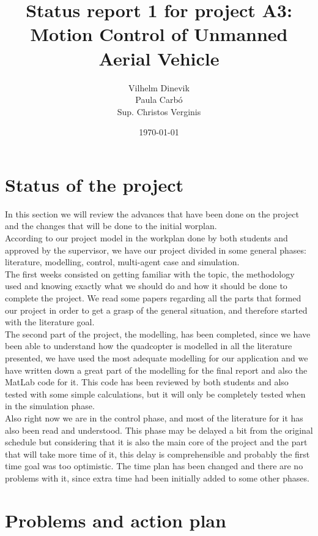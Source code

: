 \documentclass{article}
\title{Status report 1 for project A3: Motion Control of Unmanned Aerial Vehicle}
\author{Vilhelm Dinevik \\ Paula Carbó \\ Sup. Christos Verginis}
\date{\today}
\begin{document}
	\maketitle
	
	\bigskip
	\tableofcontents
	\newpage
\section{Status of the project}
In this section we will review the advances that have been done on the project and the changes that will be done to the initial worplan.  \\

According to our project model in the workplan done by both students and approved by the supervisor, we have our project divided in some general phases: literature, modelling, control, multi-agent case and simulation. \\

The first weeks consisted on getting familiar with the topic, the methodology used and knowing exactly what we should do and how it should be done to complete the project. We read some papers regarding all the parts that formed our project in order to get a grasp of the general situation, and therefore started with the literature goal. \\

The second part of the project, the modelling, has been completed, since we have been able to understand how the quadcopter is modelled in all the literature presented, we have used the most adequate modelling for our application and we have written down a great part of the modelling for the final report and also the MatLab code for it. This code has been reviewed by both students and also tested with some simple calculations, but it will only be completely tested when in the simulation phase. \\

Also right now we are in the control phase, and most of the literature for it has also been read and understood. This phase may be delayed a bit from the original schedule but considering that it is also the main core of the project and the part that will take more time of it, this delay is comprehensible and probably the first time goal was too optimistic. The time plan has been changed and there are no problems with it, since extra time had been initially added to some other phases. \\

\section{Problems and action plan}
\end{document}

